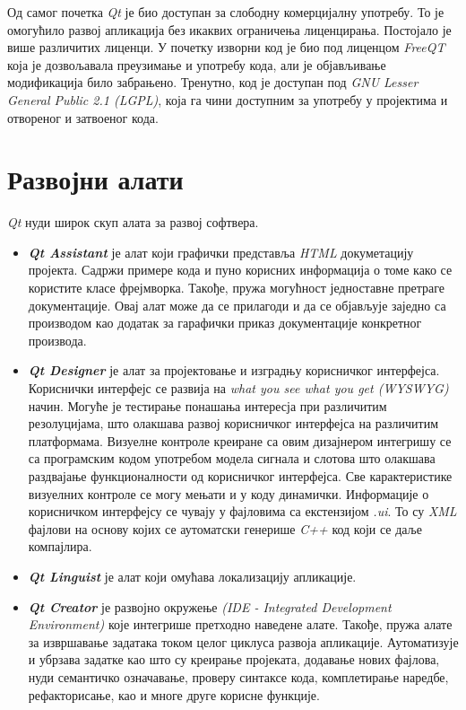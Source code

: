\documentclass[12pt,a4paper,serbian,oneside]{book}
\begin{document}
Од самог почетка \textit{Qt} је био доступан за слободну комерцијалну употребу. То је омогућило развој апликација без икаквих ограничења лиценцирања. Постојало је више различитих лиценци. У почетку изворни код је био под лиценцом \textit{FreeQT} која је дозвољавала преузимање и употребу кода, али је објављивање модификација било забрањено. Тренутно, код је доступан под \textit{GNU Lesser General Public 2.1 (LGPL)}, која га чини доступним за употребу у пројектима и отвореног и затвоеног кода.

\section{Развојни алати}

\textit{Qt} нуди широк скуп алата за развој софтвера. 

\begin{itemize}

  \item \textbf{\textit{Qt Assistant}} је алат који графички представља \textit{HTML} докуметацију пројекта. Садржи примере кода и пуно корисних информација о томе како се користите класе фрејмворка. Такође, пружа могућност једноставне претраге документације. Овај алат може да се прилагоди и да се објављује заједно са производом као додатак за гарафички приказ документације конкретног производа.

  \item \textbf{\textit{Qt Designer}} је алат за пројектовање и изградњу корисничког интерфејса. Кориснички интерфејс се развија на \textit{what you see what you get (WYSWYG)} начин. Могуће је тестирање понашања интересја при различитим резолуцијама, што олакшава развој корисничког интерфејса на различитим платформама. Визуелне контроле креиране са овим дизајнером интегришу се са програмским кодом употребом модела сигнала и слотова што олакшава раздвајање функционалности од корисничког интерфејса. Све карактеристике визуелних контроле се могу мењати и у коду динамички. Информације о корисничком интерфејсу се чувају у фајловима са екстензијом \textit{.ui}. То су \textit{XML} фајлови на основу којих се аутоматски генерише \textit{C++} код који се даље компајлира.

  \item \textbf{\textit{Qt Linguist}} је алат који омућава локализацију апликације.

  \item \textbf{\textit{Qt Creator}} је развојно окружење \textit{(IDE - Integrated Development Environment)} које интегрише претходно наведене алате. Такође, пружа алате за извршавање задатака током целог циклуса развоја апликације. Аутоматизује и убрзава задатке као што су креирање пројеката, додавање нових фајлова, нуди семантичко означавање, проверу синтаксе кода, комплетирање наредбе, рефакторисање, као и многе друге корисне функције.

\end{itemize}
\end{document}
